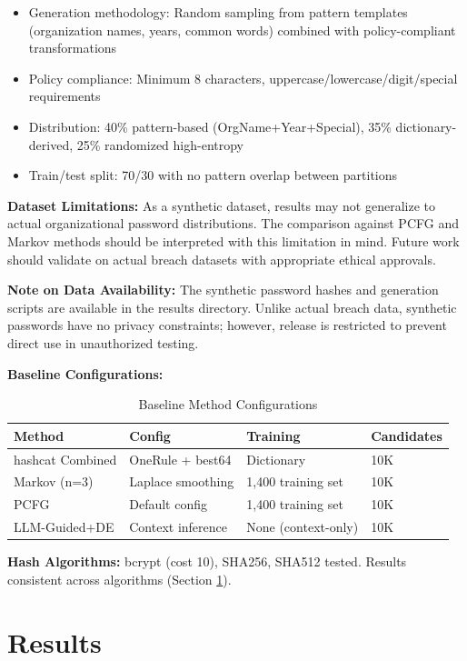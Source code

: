 \documentclass[preprint,12pt]{elsarticle}
\begin{document}
\begin{itemize}
    \item Generation methodology: Random sampling from pattern templates (organization names, years, common words) combined with policy-compliant transformations
    \item Policy compliance: Minimum 8 characters, uppercase/lowercase/digit/special requirements
    \item Distribution: 40\% pattern-based (OrgName+Year+Special), 35\% dictionary-derived, 25\% randomized high-entropy
    \item Train/test split: 70/30 with no pattern overlap between partitions
\end{itemize}

\textbf{Dataset Limitations:} As a synthetic dataset, results may not generalize to actual organizational password distributions. The comparison against PCFG and Markov methods should be interpreted with this limitation in mind. Future work should validate on actual breach datasets with appropriate ethical approvals.

\textbf{Note on Data Availability:} The synthetic password hashes and generation scripts are available in the results directory. Unlike actual breach data, synthetic passwords have no privacy constraints; however, release is restricted to prevent direct use in unauthorized testing.

\textbf{Baseline Configurations:}

\begin{table}[htbp]
\centering
\caption{Baseline Method Configurations}
\label{tab:baselines}
\begin{tabular}{llll}
\toprule
\textbf{Method} & \textbf{Config} & \textbf{Training} & \textbf{Candidates} \\
\midrule
hashcat Combined & OneRule + best64 & Dictionary & 10K \\
Markov (n=3) & Laplace smoothing & 1,400 training set & 10K \\
PCFG & Default config & 1,400 training set & 10K \\
LLM-Guided+DE & Context inference & None (context-only) & 10K \\
\bottomrule
\end{tabular}
\end{table}

\textbf{Hash Algorithms:} bcrypt (cost 10), SHA256, SHA512 tested. Results consistent across algorithms (Section \ref{sec:results}).

\section{Results}
\label{sec:results}
\end{document}
